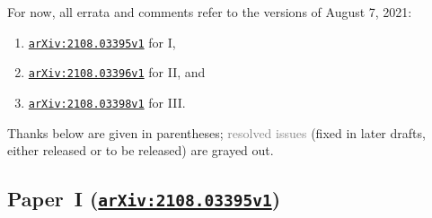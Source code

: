 \documentclass[12pt]{article}
\begin{document}
For now, all errata and comments refer to the versions of August 7, 2021:
\begin{enumerate}
    \item \href{https://arxiv.org/abs/2108.03395v1}{\texttt{arXiv:2108.03395v1}} for I,
    
    \item \href{https://arxiv.org/abs/2108.03396v1}{\texttt{arXiv:2108.03396v1}} for II,
    and
    
    \item \href{https://arxiv.org/abs/2108.03398v1}{\texttt{arXiv:2108.03398v1}} for III.
\end{enumerate}
Thanks below are given in parentheses; \textcolor{gray}{resolved issues} (fixed in later drafts, either released or to be released) are grayed out.

\subsection{Paper~I (\href{https://arxiv.org/abs/2108.03395v1}{\texttt{arXiv:2108.03395v1}})}
\end{document}
